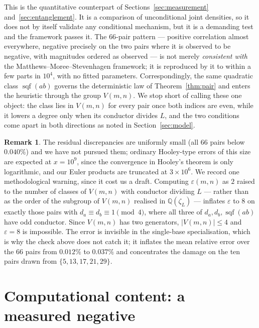 \documentclass[11pt,reqno]{amsart}
\theoremstyle{plain}
\theoremstyle{definition}
\newtheorem{remark}[theorem]{Remark}
\DeclareMathOperator{\sqf}{sqf}
\newcommand{\Q}{\mathbb{Q}}
\begin{document}
This is the quantitative counterpart of Sections~\ref{sec:measurement} and~\ref{sec:entanglement}. It is a comparison of unconditional joint densities, so it does not by itself validate any conditional mechanism, but it is a demanding test and the framework passes it. The
$66$-pair pattern --- positive correlation almost everywhere, negative precisely on the two pairs where it is observed to be negative, with magnitudes ordered as observed
--- is not merely \emph{consistent with} the Matthews--Moree--Stevenhagen framework; it is
reproduced by it to within a few parts in $10^4$, with no fitted parameters.
Correspondingly, the same quadratic class $\sqf(ab)$ governs the deterministic law of Theorem~\ref{thm:pair} and enters the heuristic through the group $V(m,n)$. We stop short of calling these one object: the class lies in $V(m,n)$ for every pair once both indices are even, while it lowers a degree only when its conductor divides $L$, and the two conditions come apart in both directions as noted in Section~\ref{sec:model}.

\begin{remark}
\label{rem:eps}
The residual discrepancies are uniformly small (all $66$ pairs below
$0.040\%$) and we have not pursued them; ordinary Hooley-type errors of this
size are expected at $x = 10^9$, since the convergence in Hooley's theorem is
only logarithmic, and our Euler products are truncated at $3 \times 10^6$.
We record one methodological warning, since it cost us a draft. Computing
$\varepsilon(m,n)$ as $2$ raised to the number of classes of $V(m,n)$ with
conductor dividing $L$ --- rather than as the order of the subgroup of $V(m,n)$
realised in $\Q(\zeta_L)$ --- inflates $\varepsilon$ to $8$ on exactly those
pairs with $d_a \equiv d_b \equiv 1 \pmod 4$, where all three of
$d_a, d_b, \sqf(ab)$ have odd conductor. Since $V(m,n)$ has two generators,
$|V(m,n)| \le 4$ and $\varepsilon = 8$ is impossible. The error is invisible in
the single-base specialisation, which is why the check above does not catch it;
it inflates the mean relative error over the $66$ pairs from $0.012\%$ to
$0.037\%$ and concentrates the damage on the ten pairs drawn from
$\{5, 13, 17, 21, 29\}$.
\end{remark}




\section{Computational content: a measured negative}
\label{sec:content}
\end{document}
